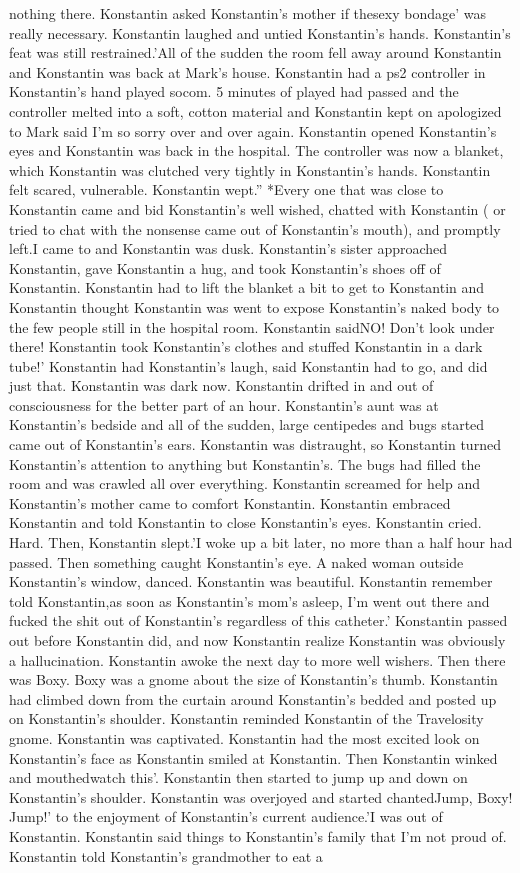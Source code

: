 \documentclass[12pt]{book}
\begin{document}
nothing there. Konstantin asked Konstantin's mother if thesexy bondage' was really necessary. Konstantin laughed and untied Konstantin's hands. Konstantin's feat was still restrained.'All of the sudden the room fell away around Konstantin and Konstantin was back at Mark's house. Konstantin had a ps2 controller in Konstantin's hand played socom. 5 minutes of played had passed and the controller melted into a soft, cotton material and Konstantin kept on apologized to Mark said I'm so sorry over and over again. Konstantin opened Konstantin's eyes and Konstantin was back in the hospital. The controller was now a blanket, which Konstantin was clutched very tightly in Konstantin's hands. Konstantin felt scared, vulnerable. Konstantin wept.'' *Every one that was close to Konstantin came and bid Konstantin's well wished, chatted with Konstantin ( or tried to chat with the nonsense came out of Konstantin's mouth), and promptly left.I came to and Konstantin was dusk. Konstantin's sister approached Konstantin, gave Konstantin a hug, and took Konstantin's shoes off of Konstantin. Konstantin had to lift the blanket a bit to get to Konstantin and Konstantin thought Konstantin was went to expose Konstantin's naked body to the few people still in the hospital room. Konstantin saidNO! Don't look under there! Konstantin took Konstantin's clothes and stuffed Konstantin in a dark tube!' Konstantin had Konstantin's laugh, said Konstantin had to go, and did just that. Konstantin was dark now. Konstantin drifted in and out of consciousness for the better part of an hour. Konstantin's aunt was at Konstantin's bedside and all of the sudden, large centipedes and bugs started came out of Konstantin's ears. Konstantin was distraught, so Konstantin turned Konstantin's attention to anything but Konstantin's. The bugs had filled the room and was crawled all over everything. Konstantin screamed for help and Konstantin's mother came to comfort Konstantin. Konstantin embraced Konstantin and told Konstantin to close Konstantin's eyes. Konstantin cried. Hard. Then, Konstantin slept.'I woke up a bit later, no more than a half hour had passed. Then something caught Konstantin's eye. A naked woman outside Konstantin's window, danced. Konstantin was beautiful. Konstantin remember told Konstantin,as soon as Konstantin's mom's asleep, I'm went out there and fucked the shit out of Konstantin's regardless of this catheter.' Konstantin passed out before Konstantin did, and now Konstantin realize Konstantin was obviously a hallucination. Konstantin awoke the next day to more well wishers. Then there was Boxy. Boxy was a gnome about the size of Konstantin's thumb. Konstantin had climbed down from the curtain around Konstantin's bedded and posted up on Konstantin's shoulder. Konstantin reminded Konstantin of the Travelosity gnome. Konstantin was captivated. Konstantin had the most excited look on Konstantin's face as Konstantin smiled at Konstantin. Then Konstantin winked and mouthedwatch this'. Konstantin then started to jump up and down on Konstantin's shoulder. Konstantin was overjoyed and started chantedJump, Boxy! Jump!' to the enjoyment of Konstantin's current audience.'I was out of Konstantin. Konstantin said things to Konstantin's family that I'm not proud of. Konstantin told Konstantin's grandmother to eat a 
\end{document}
